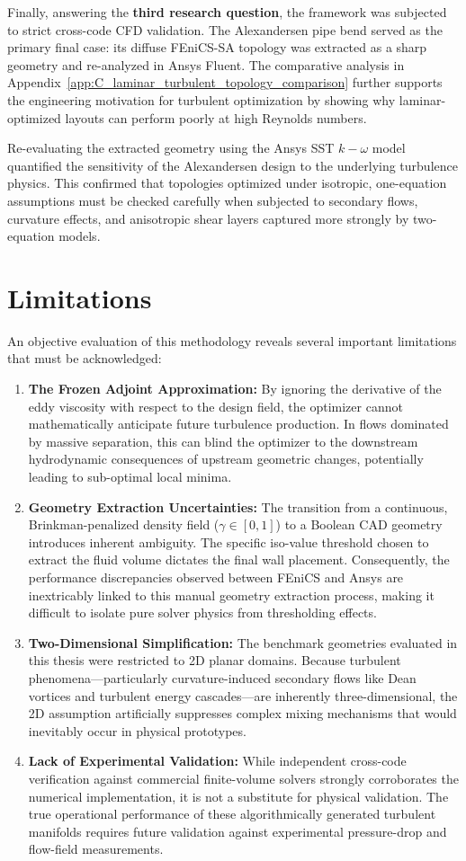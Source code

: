 Finally, answering the \textbf{third research question}, the framework was subjected to strict cross-code CFD validation. The Alexandersen pipe bend served as the primary final case: its diffuse FEniCS-SA topology was extracted as a sharp geometry and re-analyzed in Ansys Fluent. The comparative analysis in Appendix~\ref{app:C_laminar_turbulent_topology_comparison} further supports the engineering motivation for turbulent optimization by showing why laminar-optimized layouts can perform poorly at high Reynolds numbers.

Re-evaluating the extracted geometry using the Ansys SST $k-\omega$ model quantified the sensitivity of the Alexandersen design to the underlying turbulence physics. This confirmed that topologies optimized under isotropic, one-equation assumptions must be checked carefully when subjected to secondary flows, curvature effects, and anisotropic shear layers captured more strongly by two-equation models.
\section{Limitations}
An objective evaluation of this methodology reveals several important limitations that must be acknowledged:
\begin{enumerate}
	\item \textbf{The Frozen Adjoint Approximation:} By ignoring the derivative of the eddy viscosity with respect to the design field, the optimizer cannot mathematically anticipate future turbulence production. In flows dominated by massive separation, this can blind the optimizer to the downstream hydrodynamic consequences of upstream geometric changes, potentially leading to sub-optimal local minima. 
	\item \textbf{Geometry Extraction Uncertainties:} The transition from a continuous, Brinkman-penalized density field ($\gamma \in [0,1]$) to a Boolean CAD geometry introduces inherent ambiguity. The specific iso-value threshold chosen to extract the fluid volume dictates the final wall placement. Consequently, the performance discrepancies observed between FEniCS and Ansys are inextricably linked to this manual geometry extraction process, making it difficult to isolate pure solver physics from thresholding effects.
	\item \textbf{Two-Dimensional Simplification:} The benchmark geometries evaluated in this thesis were restricted to 2D planar domains. Because turbulent phenomena—particularly curvature-induced secondary flows like Dean vortices and turbulent energy cascades—are inherently three-dimensional, the 2D assumption artificially suppresses complex mixing mechanisms that would inevitably occur in physical prototypes.
	\item \textbf{Lack of Experimental Validation:} While independent cross-code verification against commercial finite-volume solvers strongly corroborates the numerical implementation, it is not a substitute for physical validation. The true operational performance of these algorithmically generated turbulent manifolds requires future validation against experimental pressure-drop and flow-field measurements.
\end{enumerate}

